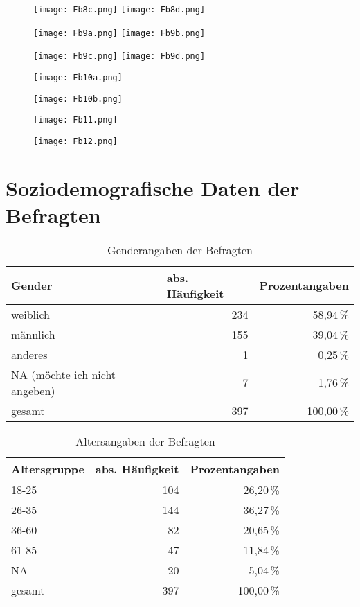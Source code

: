 \begin{figure}
\centering
\texttt{[image: Fb8c.png]}
\texttt{[image: Fb8d.png]}
\end{figure}
\begin{figure}
\centering
\texttt{[image: Fb9a.png]}
\texttt{[image: Fb9b.png]}
\end{figure}
\begin{figure}
\centering
\texttt{[image: Fb9c.png]}
\texttt{[image: Fb9d.png]}
\end{figure}
\begin{figure}
\centering
\texttt{[image: Fb10a.png]}
\end{figure}
\begin{figure}
\centering
\texttt{[image: Fb10b.png]}
\end{figure}
\begin{figure}
\centering
\texttt{[image: Fb11.png]}
\end{figure}
\begin{figure}
\centering
\texttt{[image: Fb12.png]}
\end{figure}
\section*{Soziodemografische Daten der Befragten}
\label{Anh:SoziodemografischeDaten}
\begin{table}
\centering
\begin{tabular}{lrr}
\textbf{Gender} & \multicolumn{1}{l}{\textbf{abs. Häufigkeit}} & \multicolumn{1}{l}{\textbf{Prozentangaben}} \\ \hline
weiblich & 234 & 58,94\,\% \\ %
männlich & 155 & 39,04\,\% \\ %
anderes & 1 & 0,25\,\% \\ %
NA (möchte ich nicht angeben) & 7 & 1,76\,\% \\ %
gesamt & 397 & 100,00\,\%
\end{tabular}
\caption{Genderangaben der Befragten}
\label{table:GenderAnh}
\end{table}

\begin{table}
\centering
\begin{tabular}{lrr}
\textbf{Altersgruppe} & \multicolumn{1}{l}{\textbf{abs. Häufigkeit}} & \multicolumn{1}{l}{\textbf{Prozentangaben}} \\ \hline
18-25 & 104 & 26,20\,\% \\ %
26-35 & 144 & 36,27\,\% \\ %
36-60 & 82 & 20,65\,\% \\ %
61-85 & 47 & 11,84\,\% \\ %
NA & 20 & 5,04\,\% \\ %
gesamt & 397 & 100,00\,\%
\end{tabular}
\caption{Altersangaben der Befragten}
\label{table:AltersgruppenAnh}
\end{table}


